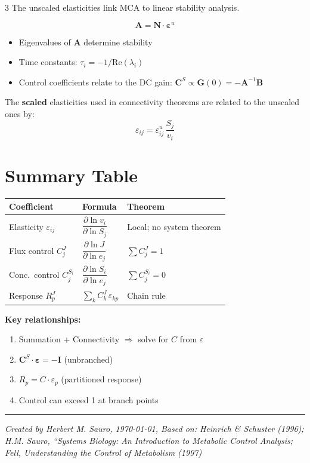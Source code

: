 \documentclass[10pt,landscape,a4paper]{article}
\begin{document}
\begin{multicols}{3}
The unscaled elasticities link MCA to linear stability analysis.

\[
  \mathbf{A} = \mathbf{N} \cdot \boldsymbol{\varepsilon}^{u}
\]

\begin{itemize}
  \item Eigenvalues of $\mathbf{A}$ determine stability
  \item Time constants: $\tau_i = -1/\text{Re}(\lambda_i)$
  \item Control coefficients relate to the DC gain:
        $\mathbf{C}^S \propto \mathbf{G}(0) = -\mathbf{A}^{-1}\mathbf{B}$
\end{itemize}

The \textbf{scaled} elasticities used in connectivity theorems are
related to the unscaled ones by:
\[
  \varepsilon_{ij} = \varepsilon_{ij}^{u}\,\frac{S_j}{v_i}
\]

\section{Summary Table}

\begin{center}
\footnotesize
\begin{tabular}{@{}p{2.1cm}p{2.2cm}p{2.5cm}@{}}
\toprule
\textbf{Coefficient} & \textbf{Formula} & \textbf{Theorem} \\
\midrule
Elasticity $\varepsilon_{ij}$
  & $\dfrac{\partial\ln v_i}{\partial\ln S_j}$
  & Local; no system theorem \\[8pt]
Flux control $C_j^J$
  & $\dfrac{\partial\ln J}{\partial\ln e_j}$
  & $\sum C_j^J = 1$ \\[8pt]
Conc.\ control $C_j^{S_i}$
  & $\dfrac{\partial\ln S_i}{\partial\ln e_j}$
  & $\sum C_j^{S_i} = 0$ \\[8pt]
Response $R_p^J$
  & $\sum_k C_k^J\,\varepsilon_{kp}$
  & Chain rule \\
\bottomrule
\end{tabular}
\end{center}

\vspace{4pt}
\textbf{Key relationships:}
\begin{enumerate}
  \item Summation + Connectivity $\Rightarrow$ solve for $C$ from $\varepsilon$
  \item $\mathbf{C}^S \cdot \boldsymbol{\varepsilon} = -\mathbf{I}$ (unbranched)
  \item $R_p = C \cdot \varepsilon_{p}$ (partitioned response)
  \item Control can exceed 1 at branch points
\end{enumerate}

\vfill
\hrule
\vspace{3pt}
\footnotesize
\textit{Created by Herbert M. Sauro, \today, Based on: Heinrich \& Schuster (1996); H.M. Sauro, ``Systems Biology: An Introduction to Metabolic Control Analysis; Fell, \textit{Understanding the Control of Metabolism} (1997)}

\end{multicols}
\end{document}
